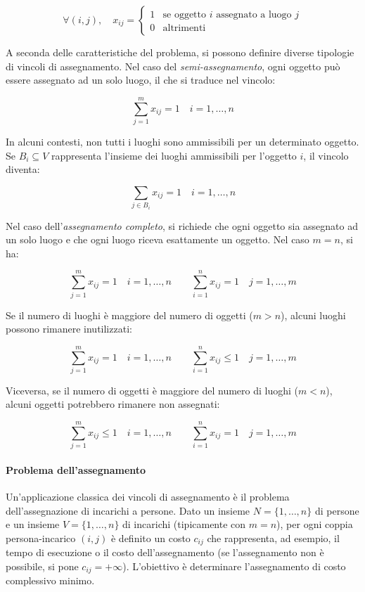 \documentclass[12pt]{extarticle} %
\begin{document}
\[
\forall(i,j), \quad x_{ij} = \begin{cases} 
1 & \text{se oggetto } i \text{ assegnato a luogo } j \\ 
0 & \text{altrimenti}
\end{cases}
\]

\noindent A seconda delle caratteristiche del problema, si possono definire diverse tipologie di vincoli di assegnamento. Nel caso del \textit{semi-assegnamento}, ogni oggetto può essere assegnato ad un solo luogo, il che si traduce nel vincolo:

\[
\sum_{j=1}^{m} x_{ij} = 1 \quad i = 1, \dots, n
\]

In alcuni contesti, non tutti i luoghi sono ammissibili per un determinato oggetto. Se $B_i \subseteq V$ rappresenta l'insieme dei luoghi ammissibili per l'oggetto $i$, il vincolo diventa:

\[
\sum_{j \in B_i} x_{ij} = 1 \quad i = 1, \dots, n
\]

Nel caso dell'\textit{assegnamento completo}, si richiede che ogni oggetto sia assegnato ad un solo luogo e che ogni luogo riceva esattamente un oggetto. Nel caso $m = n$, si ha:

\[
\sum_{j=1}^{m} x_{ij} = 1 \quad i = 1, \dots, n \qquad \sum_{i=1}^{n} x_{ij} = 1 \quad j = 1, \dots, m
\]

Se il numero di luoghi è maggiore del numero di oggetti ($m > n$), alcuni luoghi possono rimanere inutilizzati:

\[
\sum_{j=1}^{m} x_{ij} = 1 \quad i = 1, \dots, n \qquad \sum_{i=1}^{n} x_{ij} \leq 1 \quad j = 1, \dots, m
\]

Viceversa, se il numero di oggetti è maggiore del numero di luoghi ($m < n$), alcuni oggetti potrebbero rimanere non assegnati:

\[
\sum_{j=1}^{m} x_{ij} \leq 1 \quad i = 1, \dots, n \qquad \sum_{i=1}^{n} x_{ij} = 1 \quad j = 1, \dots, m
\]

\paragraph{Problema dell'assegnamento}
Un'applicazione classica dei vincoli di assegnamento è il problema dell'assegnazione di incarichi a persone. Dato un insieme $N = \{1,\ldots,n\}$ di persone e un insieme $V = \{1,\ldots,n\}$ di incarichi (tipicamente con $m = n$), per ogni coppia persona-incarico $(i,j)$ è definito un costo $c_{ij}$ che rappresenta, ad esempio, il tempo di esecuzione o il costo dell'assegnamento (se l'assegnamento non è possibile, si pone $c_{ij} = +\infty$). L'obiettivo è determinare l'assegnamento di costo complessivo minimo.
\end{document}
